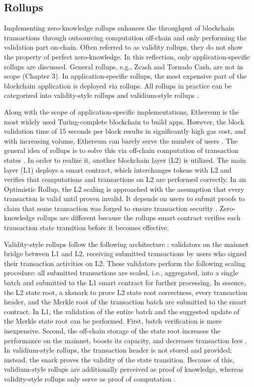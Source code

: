 \subsection{Rollups}
Implementing zero-knowledge rollups enhances the throughput of blockchain transactions through outsourcing computation off-chain and only performing the validation part on-chain. Often referred to as validity rollups, they do not show the property of perfect zero-knowledge. In this reflection, only application-specific rollups are discussed. General rollups, e.g., Zcash and Tornado Cash, are not in scope (Chapter 3). In application-specific rollups, the most expensive part of the blockchain application is deployed via rollups. All rollups in practice can be categorized into validity-style rollups and validium-style rollups \citep{chen2022review}.

Along with the scope of application-specific implementations, Ethereum is the most widely used Turing-complete blockchain to build apps. However, the block validation time of 15 seconds per block results in significantly high gas cost, and with increasing volume, Ethereum can barely serve the number of users \citep{scalingintro}. The general idea of rollups is to solve this via off-chain computation of transaction states \citep{chen2022review}. In order to realize it, another blockchain layer (L2) is utilized. The main layer (L1) deploys a smart contract, which interchanges tokens with L2 and verifies that computations and transactions on L2 are performed correctly. In an Optimistic Rollup, the L2 scaling is approached with the assumption that every transaction is valid until proven invalid. It depends on users to submit proofs to claim that some transaction was forged to ensure transaction security \citep{zksyncintro}. Zero-knowledge rollups are different because the rollups smart contract verifies each transaction state transition before it becomes effective. 

Validity-style rollups follow the following architecture \citep{buterinrollups}: validators on the mainnet bridge between L1 and L2, receiving submitted transactions by users who signed their transaction activities on L2. These validators perform the following scaling procedure: all submitted transactions are scaled, i.e., aggregated, into a single batch and submitted to the L1 smart contract for further processing. In essence, the L2 state root, a \acrshort{zksnark} to prove L2 state root correctness, every transaction header, and the Merkle root of the transaction batch are submitted to the smart contract. In L1, the validation of the entire batch and the suggested update of the Merkle state root can be performed. First, batch verification is more inexpensive. Second, the off-chain storage of the state root increases the performance on the mainnet, boosts its capacity, and decreases transaction fees \citep{chen2022review}. In validium-style rollups, the transaction header is not stored and provided; instead, the \acrshort{snark} proves the validity of the state transition. Because of this, validium-style rollups are additionally perceived as proof of knowledge, whereas validity-style rollups only serve as proof of computation \citep{validiumintro}. 

